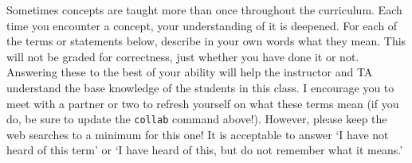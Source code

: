 \documentclass{article}
\begin{document}




\collab{\todo{}}

Sometimes concepts are taught more than once throughout the curriculum.  Each
time you encounter a concept, your understanding of it is deepened.
For each of the terms or statements below, describe in your own words what they
mean.  This will not be graded for correctness, just whether you have done it or
not.  Answering these to the best of your ability will help the instructor and
TA understand the base knowledge of the students in this class.
I encourage you to meet with a partner or two to refresh yourself on what these
terms mean (if you do, be sure to update the \texttt{collab} command
above!).  However, please keep the web searches to a minimum for this one!  It
is acceptable to answer `I have not heard of this term' or `I have heard of
this, but do not remember what it means.'
\end{document}
